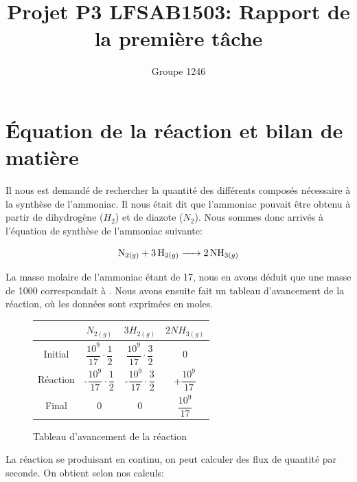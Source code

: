 \documentclass[11pt,a4paper]{report}
\author{Groupe 1246}
\title{Projet P3 LFSAB1503: Rapport de la première tâche}
\begin{document}
\maketitle

\section*{Équation de la réaction et bilan de matière}

Il nous est demandé de rechercher la quantité des différents composés nécessaire à la synthèse de l'ammoniac.
Il nous était dit que l'ammoniac pouvait être obtenu à partir de dihydrogène ($H_2$) et de diazote ($N_2$).
Nous sommes donc arrivés à l'équation de synthèse de l'ammoniac suivante: 


 $$\ce{N_{2(g)} + 3H_{2(g)} -> 2NH_{3(g)}}$$

La masse molaire de l'ammoniac étant de \unit{17}{\gram\per\mole}, nous en avons déduit que une masse de \unit{1000}{\ton}
correspondait à \unit{}{\mole}. Nous avons ensuite fait un tableau d'avancement de la réaction,
où les données sont exprimées en moles.

\begin{figure}[h]
\centering
\begin{tabular}{|c|c|c|c|}
\hline 
 & $N_{2(g)}$ & $3H_{2(g)} $ & $2NH_{3(g)}$ \\ 
\hline 
Initial & $\dfrac{10^{9}}{17} \cdot \dfrac{1}{2}$ & $\dfrac{10^{9}}{17} \cdot \dfrac{3}{2}$ & 0 \\ 
\hline 
Réaction & -$\dfrac{10^{9}}{17} \cdot \dfrac{1}{2}$ & -$\dfrac{10^{9}}{17} \cdot \dfrac{3}{2}$ & +$\dfrac{10^{9}}{17}$ \\ 
\hline 
Final & 0 & 0 & $\dfrac{10^{9}}{17}$ \\ 
\hline 
\end{tabular} 
\caption{Tableau d'avancement de la réaction}
\label{tableau}
\end{figure}

La réaction se produisant en continu, on peut calculer des flux de quantité par seconde.
On obtient selon nos calculs:

\begin{itemize}
  \item{une consommation de $N_2$ égale à: $\dfrac{10^{9}}{17} \cdot \dfrac{1}{2} \cdot \dfrac{1}{3600 \cdot 24} = 340.41 $ \unit{}{\mole\per\second}.}
  \item{une consommation de $H_2$ égale à: $\dfrac{10^{9}}{17} \cdot \dfrac{3}{2} \cdot \dfrac{1}{3600 \cdot 24} = 1021.241 $\unit{}{\mole\per\second}
  \item{une production de $NH_3$ égale à: $\dfrac{10^{9}}{17}} \cdot \dfrac{1}{3600 \cdot 24} = 680.827$ \unit{}{\mole\per\second}
}}\end{itemize}
\end{document}
